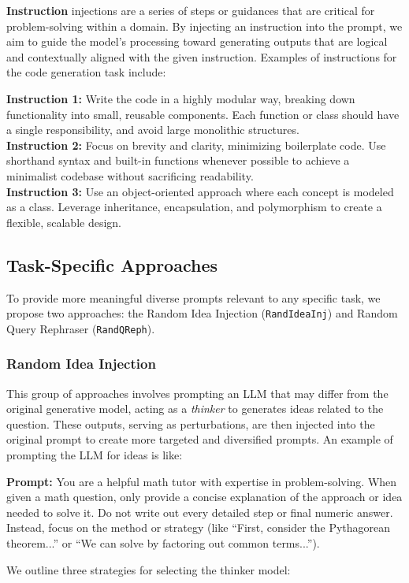 \textbf{Instruction} injections are a series of steps or guidances that are critical for problem-solving within a domain. By injecting an instruction into the prompt, we aim to guide the model's processing toward generating outputs that are logical and contextually aligned with the given instruction. 
Examples of instructions for the code generation task include:
\begin{tcolorbox}[title=Example Instructions for Code Generation, colframe=low]
\scriptsize{
  \textbf{Instruction 1:} Write the code in a highly modular way, breaking down functionality into small, reusable components. Each function or class should have a single responsibility, and avoid large monolithic structures.\\


  \textbf{Instruction 2:} Focus on brevity and clarity, minimizing boilerplate code. Use shorthand syntax and built-in functions whenever possible to achieve a minimalist codebase without sacrificing readability.\\

  \textbf{Instruction 3:} Use an object-oriented approach where each concept is modeled as a class. Leverage inheritance, encapsulation, and polymorphism to create a flexible, scalable design.
  
  }
\end{tcolorbox}
\normalsize
\subsection{Task-Specific Approaches}
\label{sec:task-specific}
To provide more meaningful diverse prompts relevant to any specific task, we propose two approaches: the  Random Idea Injection (\texttt{RandIdeaInj}) and Random Query Rephraser (\texttt{RandQReph}).
\subsubsection{Random Idea Injection}
\label{sec:RandIdeaInj}
This group of approaches involves prompting an LLM that may differ from the original generative model, acting as a \emph{thinker} to generates ideas related to the question. 
These outputs, serving as perturbations, are then injected into the original prompt to create more targeted and diversified prompts. An example of prompting the LLM for ideas is like:
\begin{tcolorbox}[title=Prompt to Seek Ideas on Solving the Math Problem, colframe=low]
\scriptsize{
  \textbf{Prompt:} You are a helpful math tutor with expertise in problem-solving. When given a math question, only provide a concise explanation of the approach or idea needed to solve it. Do not write out every detailed step or final numeric answer. Instead, focus on the method or strategy (like “First, consider the Pythagorean theorem...” or “We can solve by factoring out common terms...”).
  }
\end{tcolorbox}
\normalsize
We outline three strategies for selecting the thinker model:

